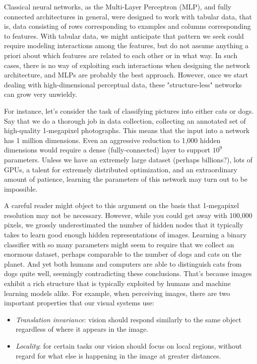 Classical neural networks, as the Multi-Layer Perceptron (MLP), and fully connected architectures in general, were designed to work with tabular data, that is, data consisting of rows corresponding to examples and columns corresponding to features. With tabular data, we might anticipate that pattern we seek could require modeling interactions among the features, but do not assume anything a priori about which features are related to each other or in what way. In such cases, there is no way of exploiting such interactions when designing the network architecture, and MLPs are probably the best approach. However, once we start dealing with high-dimensional perceptual data, these "structure-less" networks can grow very unwieldy. 

For instance, let’s consider the task of classifying pictures into either cats or dogs. Say that we do a thorough job in data collection, collecting an annotated set of high-quality 1-megapixel photographs. This means that the input into a network has 1 million dimensions. Even an aggressive reduction to 1,000 hidden dimensions would require a dense (fully-connected) layer to support  $10^9$  parameters. Unless we have an extremely large dataset (perhaps billions?), lots of GPUs, a talent for extremely distributed optimization, and an extraordinary amount of patience, learning the parameters of this network may turn out to be impossible.

A careful reader might object to this argument on the basis that 1-megapixel resolution may not be necessary. However, while you could get away with 100,000 pixels, we grossly underestimated the number of hidden nodes that it typically takes to learn good enough hidden representations of images. Learning a binary classifier with so many parameters might seem to require that we collect an enormous dataset, perhaps comparable to the number of dogs and cats on the planet. And yet both humans and computers are able to distinguish cats from dogs quite well, seemingly contradicting these conclusions. That’s because images exhibit a rich structure that is typically exploited by humans and machine learning models alike. For example, when perceiving images, there are two important properties that our visual systems use:

\begin{itemize}
    \item \textit{Translation invariance}: vision should respond similarly to the same object regardless of where it appears in the image.
    \item \textit{Locality}: for certain tasks our vision should focus on local regions, without regard for what else is happening in the image at greater distances.
\end{itemize}


